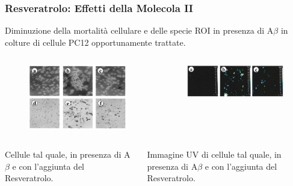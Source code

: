 \documentclass[9pt]{beamer}
\begin{document}
\begin{frame}
	\frametitle{Resveratrolo: Effetti della Molecola II}
	
	Diminuzione della mortalità cellulare e delle specie ROI in presenza di A$\beta$ in colture di cellule PC12 opportunamente trattate.
	\begin{columns}
		\begin{column}{0.5\textwidth}
			\begin{figure}
				\includegraphics[width=\textwidth]{immagini/apo_resveratrolo.png}
			\end{figure}
		\end{column}
		\begin{column}{0.5\textwidth}
			\begin{figure}
				\includegraphics[width=\textwidth]{immagini/roi_resveratrolo.png}
			\end{figure}
		\end{column}
	\end{columns}
	\medskip
	\begin{columns}
		\begin{column}{0.5\textwidth}
			Cellule tal quale, in presenza di A$\beta$ e con l'aggiunta del Resveratrolo.
		\end{column}
		\begin{column}{0.5\textwidth}
			Immagine UV di cellule tal quale, in presenza di A$\beta$ e con l'aggiunta del Resveratrolo.
		\end{column}
	\end{columns}
	
\end{frame}
\end{document}
